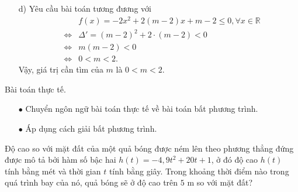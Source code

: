 \begin{vd}
{\begin{itemize}
\begin{center}
			\end{center}
			Dựa vào bảng xét dấu ta thấy $m \in \left[ \dfrac{1}{2};1\right]$ thoả mãn yêu cầu bài toán.
			\item [d)] Yêu cầu bài toán tương đương với
			{\allowdisplaybreaks
				\begin{eqnarray*}
					&&f(x)=-2x^2+2(m-2)x+m-2\le 0,\forall x\in\mathbb{R} \\
					&\Leftrightarrow & \Delta' =(m-2)^2+2\cdot(m-2)< 0\\
					&\Leftrightarrow & m(m-2)< 0\\
					&\Leftrightarrow & 0< m< 2.
			\end{eqnarray*}}
			Vậy, giá trị cần tìm của $m$ là $0< m< 2$.
		\end{itemize}
	}
\end{vd}

\begin{dang}{Bài toán thực tế.}
	\begin{itemize}
		\item [$\bullet$] Chuyển ngôn ngữ bài toán thực tế về bài toán bất phương trình.
		\item [$\bullet$] Áp dụng cách giải bất phương trình.
	\end{itemize}
\end{dang}
\begin{vd}%
	Độ cao so với mặt đất của một quả bóng được ném lên theo phương thẳng đứng được mô tả bởi hàm số bậc hai $h(t)=-4,9 t^{2}+20 t+1$, ở đó độ cao $h(t)$ tính bằng mét và thời gian $t$ tính bằng giây. Trong khoảng thời điểm nào trong quá trình bay của nó, quả bóng sẽ ở độ cao trên $5$ m so với mặt đất?
\end{vd}

